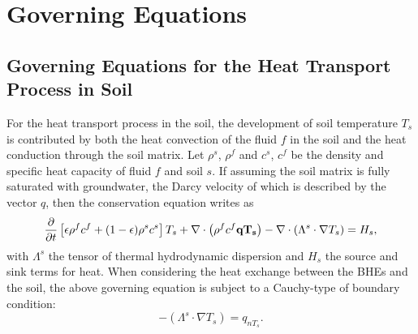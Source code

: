 \section{Governing Equations}
\subsection{Governing Equations for the Heat Transport Process in Soil}
For the heat transport process in the soil, the development of soil temperature $T_s$ is contributed by both the heat convection of the fluid $f$ in the soil and the heat conduction through the soil matrix. Let $\rho^s$, $\rho^f$ and $c^s$, $c^f$ be the density and specific heat capacity of fluid $f$ and soil $s$. If assuming the soil matrix is fully saturated with groundwater, the Darcy velocity of which is described by the vector $q$, then the conservation equation writes as
\begin{equation}
\frac{\partial}{\partial t}  \left[ \epsilon \rho^f c^f + ( 1-\epsilon ) \rho^s c^s \right]  T_s 
+ \nabla \cdot \left(  \rho^f c^f \bf{q} T_s  \right) 
- \nabla \cdot \left(  \Lambda^s \cdot \nabla T_s  \right) = H_s,  
\end{equation}
with $\Lambda^s$ the tensor of thermal hydrodynamic dispersion and $H_s$ the source and sink terms for heat. When considering the heat exchange between the BHEs and the soil, the above governing equation is subject to a Cauchy-type of boundary condition: 
\begin{equation}
- \left(  \Lambda^s \cdot \nabla T_s  \right) = q_{n T_s}. 
\end{equation}

